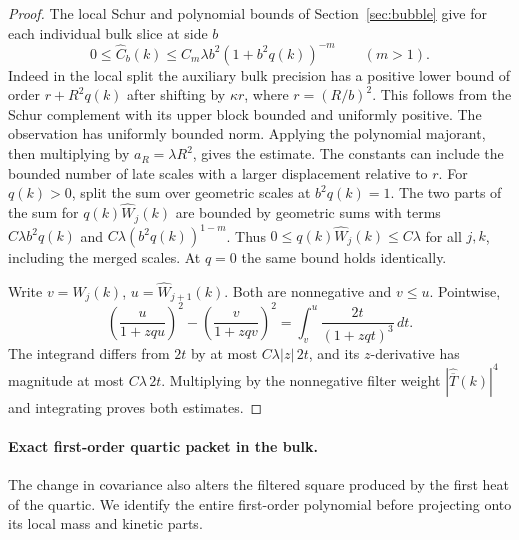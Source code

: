 \documentclass[11pt]{article}
\theoremstyle{definition}
\begin{document}
\begin{proof}
The local Schur and polynomial bounds of Section~\ref{sec:bubble}
give for each individual bulk slice at side \(b\)
\begin{equation}
  0\le\widehat C_b(k)\le
       C_m\lambda b^2(1+b^2q(k))^{-m}
       \qquad(m>1).
\end{equation}
Indeed in the local split the auxiliary bulk precision has a
positive lower bound of order \(r+R^2 q(k)\) after shifting by
\(\kappa r\), where \(r=(R/b)^2\). This follows from the Schur
complement with its upper block bounded and uniformly positive.
The observation has uniformly bounded norm. Applying the
polynomial majorant, then multiplying by \(a_R=\lambda R^2\),
gives the estimate. The constants can include the bounded
number of late scales with a larger displacement relative to
\(r\). For \(q(k)>0\), split the sum over geometric scales at
\(b^2q(k)=1\). The two parts of the sum for
\(q(k)\widehat W_j(k)\) are bounded by geometric sums with terms
\(C\lambda b^2q(k)\) and \(C\lambda(b^2q(k))^{1-m}\).
Thus \(0\le q(k)\widehat W_j(k)\le C\lambda\) for all \(j,k\),
including the merged scales. At \(q=0\) the same bound holds
identically.

Write \(v=\widehat W_j(k)\), \(u=\widehat W_{j+1}(k)\). Both
are nonnegative and \(v\le u\). Pointwise,
\begin{equation}
 \left(\frac{u}{1+zq u}\right)^2
     -\left(\frac{v}{1+zq v}\right)^2
 =\int_v^u\frac{2t}{(1+zq t)^3}\,dt.
\end{equation}
The integrand differs from \(2t\) by at most
\(C\lambda |z|\,2t\), and its \(z\)-derivative has magnitude
at most \(C\lambda\,2t\). Multiplying by the nonnegative
filter weight \(|\widehat{\overline T}(k)|^4\) and integrating
proves both estimates.
\end{proof}

\paragraph{Exact first-order quartic packet in the bulk.}
The change in covariance also alters the filtered square produced
by the first heat of the quartic. We identify the entire
first-order polynomial before projecting onto its local mass and
kinetic parts.
\end{document}
